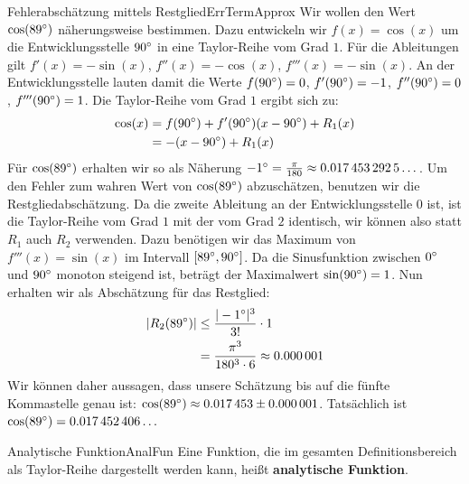 \begin{example}{Fehlerabschätzung mittels Restglied}{ErrTermApprox}
    Wir wollen den Wert $\cos(\SI{89}{\degree})$ näherungsweise bestimmen. Dazu entwickeln wir $f(x) = \cos(x)$ um die Entwicklungsstelle $\SI{90}{\degree}$ in eine Taylor-Reihe vom Grad $1$. Für die Ableitungen gilt $f'(x) = -\sin(x)$, $f''(x) = -\cos(x)$, $f'''(x) = -\sin(x)$. An der Entwicklungsstelle lauten damit die Werte $f(\SI{90}{\degree}) = 0$, $f'(\SI{90}{\degree}) = -1$, $f''(\SI{90}{\degree}) = 0$, $f'''(\SI{90}{\degree}) = 1$. Die Taylor-Reihe vom Grad $1$ ergibt sich zu:
    \begin{alignat*}{1}
        \cos(x) &= f(\SI{90}{\degree}) + f'(\SI{90}{\degree}) (x-\SI{90}{\degree}) + R_1(x) \\
                &= -(x-\SI{90}{\degree}) + R_1(x)
    \end{alignat*}
    Für $\cos(\SI{89}{\degree})$ erhalten wir so als Näherung $-\SI{1}{\degree} = \frac{\pi}{180} \approx \num{0.0174532925}\dots$. Um den Fehler zum wahren Wert von $\cos(\SI{89}{\degree})$ abzuschätzen, benutzen wir die Restgliedabschätzung. Da die zweite Ableitung an der Entwicklungsstelle $0$ ist, ist die Taylor-Reihe vom Grad $1$ mit der vom Grad $2$ identisch, wir können also statt $R_1$ auch $R_2$ verwenden. Dazu benötigen wir das Maximum von $f'''(x) = \sin(x)$ im Intervall $[\SI{89}{\degree}, \SI{90}{\degree}]$. Da die Sinusfunktion zwischen $\SI{0}{\degree}$ und $\SI{90}{\degree}$ monoton steigend ist, beträgt der Maximalwert $\sin(\SI{90}{\degree}) = 1$. Nun erhalten wir als Abschätzung für das Restglied:
    \begin{alignat*}{1}
        |R_2(\SI{89}{\degree})| &\le \frac{|-\SI{1}{\degree}|^3}{3!} \cdot 1 \\
                           &= \frac{\pi^3}{180^3 \cdot 6} \approx \num{0.000001}
    \end{alignat*}
    Wir können daher aussagen, dass unsere Schätzung bis auf die fünfte Kommastelle genau ist: $\cos(\SI{89}{\degree}) \approx  \num{0.017453} \pm \num{0.000001}$. Tatsächlich ist $\cos(\SI{89}{\degree}) = \num{0.017452406}\dots$
\end{example}

\begin{definition}{Analytische Funktion}{AnalFun}
    Eine Funktion, die im gesamten Definitionsbereich als Taylor-Reihe dargestellt werden kann, heißt \textbf{analytische Funktion}.
\end{definition}

